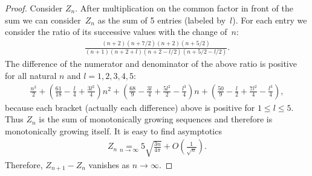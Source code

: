 \documentclass[pdftex]{sigma}
\numberwithin{equation}{section}
\begin{document}
\begin{proof}
Consider $Z_n$. After multiplication on the common factor in front of the sum we can consi\-der~$Z_n$ as the sum of 5
entries (labeled by~$l$). For each entry we consider the ratio of its successive values with the change of~$n$:
\begin{gather*}
\frac{(n+2)(n+7/2)(n+2)(n+5/2)}{(n+1)(n+2+l)(n+2-l/2)(n+5/2-l/2)}.
\end{gather*}
The difference of the numerator and denominator of the above ratio is positive for all natural $n$ and $l=1,2,3,4,5$:
\begin{gather*}
\frac{n^3}{2}+\left(\frac{61}{18}-\frac{l}{4}+\frac{3l^2}{4}\right)n^2+
\left(\frac{68}{9}-\frac{3l}{4}+\frac{5l^2}{2}-\frac{l^3}{4}\right)n+
\left(\frac{50}{9}-\frac{l}{2}+\frac{7l^2}{4}-\frac{l^3}{4}\right),
\end{gather*}
because each bracket (actually each difference) above is positive for $1\leq l\leq5$. Thus $Z_n$ is the sum of monotonically
growing sequences and therefore is monotonically growing itself. It is easy to find asymptotics
\begin{gather*}
Z_n\underset{n\to\infty}=5\sqrt{\frac{3n}{4\pi}}+O\left(\frac{1}{\sqrt{n}}\right).
\end{gather*}
Therefore, $Z_{n+1}-Z_n$ vanishes as $n\to\infty$.


\end{proof}
\end{document}
